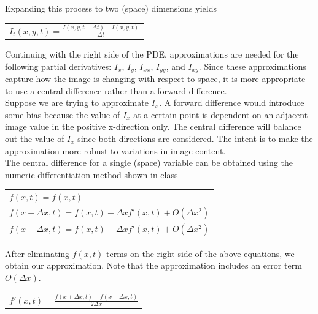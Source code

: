 \documentclass{article}
\begin{document}
  \noindent
  Expanding this process to two (space) dimensions yields
  \begin{center}
    \begin{tabular}{l}
      $I_{t}(x,y,t) = \frac{I(x,y,t+\Delta t) - I(x,y,t)}{\Delta t}$\\
    \end{tabular}
  \end{center}
  \vspace{12pt}

  \noindent
  Continuing with the right side of the PDE, approximations are needed for the following partial
  derivatives: $I_{x}$, $I_{y}$, $I_{xx}$, $I_{yy}$, and $I_{xy}$. Since these approximations
  capture how the image is changing with respect to space, it is more appropriate to use a
  central difference rather than a forward difference.\\
  
  \noindent
  Suppose we are trying to approximate
  $I_{x}$. A forward difference would introduce some bias because the value of $I_{x}$ at
  a certain point is dependent on an adjacent image value in the positive x-direction only.
  The central difference will balance out the value of $I_{x}$ since both directions
  are considered. The intent is to make the approximation more robust to variations in image content. \\

  \newpage
  \noindent
  The central difference for a single (space) variable can be obtained using the
  numeric differentiation method shown in class
  \begin{center}
    \begin{tabular}{l}
      \vspace{12pt}
      $f(x,t) = f(x,t)$\\
      \vspace{12pt}
      $f(x+\Delta x,t) = f(x,t) + \Delta x f'(x,t) + O(\Delta x^2)$\\
      \vspace{12pt}
      $f(x-\Delta x,t) = f(x,t) - \Delta x f'(x,t) + O(\Delta x^2)$\\
    \end{tabular}
  \end{center}

  \noindent
  After eliminating $f(x,t)$ terms on the right side of the above equations,
  we obtain our approximation. Note that the approximation includes an error term $O(\Delta x)$.
  \begin{center}
    \begin{tabular}{l}
      \vspace{12pt}
      $f'(x,t) = \frac{f(x+\Delta x,t) - f(x-\Delta x,t)}{2\Delta x}$\\
    \end{tabular}
  \end{center}
\end{document}
